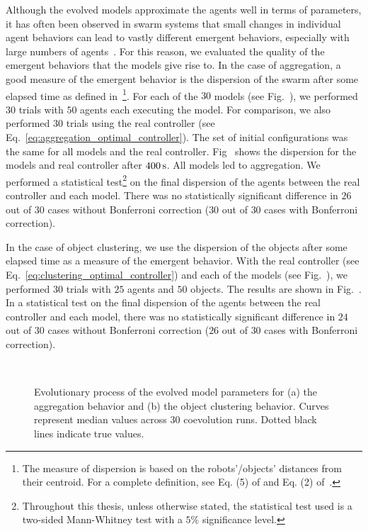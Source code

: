 Although the evolved models approximate the agents well in terms of parameters, it has often been observed in swarm systems that small changes in individual agent behaviors can lead to vastly different emergent behaviors, especially with large numbers of agents~\cite{Paul2010, Luca2014}. For this reason, we evaluated the quality of the emergent behaviors that the models give rise to. In the case of aggregation, a good measure of the emergent behavior is the dispersion of the swarm after some elapsed time as defined in~\cite{Gauci2014_ijrr}\footnote{The measure of dispersion is based on the robots'/objects' distances from their centroid. For a complete definition, see Eq. (5) of \cite{Gauci2014_ijrr} and Eq. (2) of~\cite{Melvin2014_aamas}.}. For each of the $30$ models (see Fig.~), we performed $30$ trials with $50$ agents each executing the model. For comparison, we also performed $30$ trials using the real controller (see Eq.~\eqref{eq:aggregation_optimal_controller}). The set of initial configurations was the same for all models and the real controller. Fig~ shows the dispersion for the models and real controller after $\unit[400]{s}$. All models led to aggregation. We performed a statistical test\footnote{Throughout this thesis, unless otherwise stated, the statistical test used is a two-sided Mann-Whitney test with a $5\%$ significance level.} on the final dispersion of the agents between the real controller and each model. There was no statistically significant difference in $26$ out of $30$ cases without Bonferroni correction ($30$ out of $30$ cases with Bonferroni correction). 

In the case of object clustering, we use the dispersion of the objects after some elapsed time as a measure of the emergent behavior. With the real controller (see Eq.~\eqref{eq:clustering_optimal_controller}) and each of the models (see Fig.~), we performed $30$ trials with $25$ agents and $50$ objects. The results are shown in Fig.~. In a statistical test on the final dispersion of the agents between the real controller and each model, there was no statistically significant difference in $24$ out of $30$ cases without Bonferroni correction ($26$ out of $30$ cases with Bonferroni correction).

\begin{figure}[!t]%
	\centering
		\\
		\caption{Evolutionary process of the evolved model parameters for (a) the aggregation behavior and (b) the object clustering behavior. Curves represent median values across 30 coevolution runs. Dotted black lines indicate true values. \label{fig:model_parameters_convergence}}
\end{figure}

